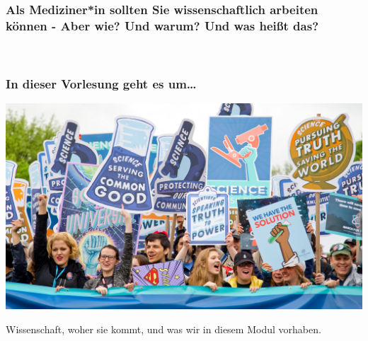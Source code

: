 \documentclass{beamer}
\begin{document}
\begin{frame}
\frametitle{Als Mediziner*in sollten Sie wissenschaftlich arbeiten können - Aber wie? Und warum? Und was heißt das?}

\begin{figure}
    \centering
    \\
    
\end{figure}
\end{frame}



\begin{frame}
\frametitle{In dieser Vorlesung geht es um\dots}

\begin{center}
    \includegraphics[width=\textwidth]{vlad-tchompalov-nKNrOZ5MXZY-unsplash.jpg}
\end{center}

Wissenschaft, woher sie kommt, und was wir in diesem Modul  vorhaben. 


\end{frame}
\end{document}
